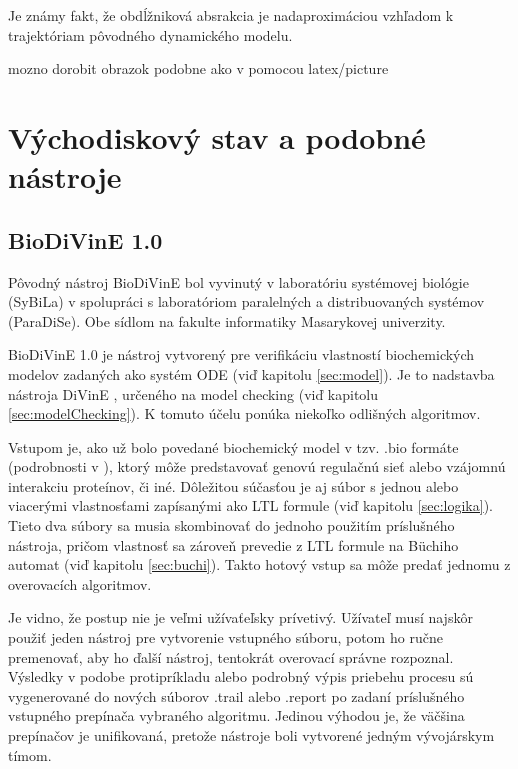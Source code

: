 \documentclass[11pt,final,oneside]{fithesis}
\begin{document}
Je zn\'amy fakt, \v ze obd\'l\v znikov\'a absrakcia je nadaproxim\'aciou vzh\v ladom k trajekt\'oriam p\^ ovodn\'eho dynamick\'eho modelu.
\cite{BIODIVINE}

mozno dorobit obrazok podobne ako v \cite{BIODIVINE} pomocou latex/picture


\chapter{V\'ychodiskov\'y stav a podobn\' e n\'astroje}

\section{BioDiVinE 1.0}
\label{sec:biodivine}
P\^ ovodn\'y n\'astroj BioDiVinE bol vyvinut\'y v laborat\'oriu syst\'emovej biol\'ogie (SyBiLa)\cite{sybila} v spolupr\'aci s laborat\'oriom paraleln\'ych 
a distribuovan\'ych syst\'emov (ParaDiSe)\cite{paradise}. Obe s\'idlom na fakulte informatiky Masarykovej univerzity. 

BioDiVinE 1.0 je n\'astroj vytvoren\'y pre verifik\'aciu vlastnost\'i biochemick\'ych modelov zadan\'ych ako syst\'em ODE (vi\v d kapitolu \ref{sec:model}).
Je to nadstavba n\'astroja DiVinE \cite{divine}, ur\v cen\'eho na model checking (vi\v d kapitolu \ref{sec:modelChecking}). K tomuto 
\'u\v celu pon\'uka nieko\v lko odli\v sn\'ych algoritmov.

Vstupom je, ako u\v z bolo povedan\'e biochemick\'y model v tzv. .bio form\'ate (podrobnosti v \cite{sybila-biodivine}), ktor\'y 
m\^ o\v ze predstavova\v t genov\'u regula\v cn\'u sie\v t alebo vz\'ajomn\'u interakciu prote\'inov, \v ci in\'e. D\^ ole\v zitou s\'u\v cas\v tou je aj
s\'ubor s jednou alebo viacer\'ymi vlastnos\v tami zap\'isan\'ymi ako LTL formule (vi\v d kapitolu \ref{sec:logika}). Tieto dva s\'ubory sa musia skombinova\v t
do jednoho pou\v zit\'im pr\'islu\v sn\'eho n\'astroja, pri\v com vlastnos\v t sa z\'arove\v n prevedie z LTL formule na B\" uchiho automat (vi\v d kapitolu 
\ref{sec:buchi}). Takto hotov\'y vstup sa m\^ o\v ze preda\v t jednomu z overovac\'ich algoritmov.

Je vidno, \v ze postup nie je ve\v lmi u\v z\'iva\v te\v lsky pr\'ivetiv\'y. U\v z\'ivate\v l mus\'i najsk\^ or pou\v zi\v t jeden n\'astroj 
pre vytvorenie vstupn\'eho s\'uboru, potom ho ru\v cne premenova\v t, aby ho \v dal\v s\'i n\'astroj, tentokr\'at overovac\'i spr\'avne rozpoznal. V\'ysledky
v podobe protipr\'ikladu alebo podrobn\'y v\'ypis priebehu procesu s\'u vygenerovan\'e do nov\'ych s\'uborov .trail alebo .report po zadan\'i pr\'islu\v sn\'eho
vstupn\'eho prep\'ina\v ca vybran\'eho algoritmu. Jedinou v\'yhodou je, \v ze v\"a\v c\v sina prep\'ina\v cov je unifikovan\'a, preto\v ze n\'astroje boli vytvoren\'e
jedn\'ym v\'yvoj\'arskym t\'imom.
\end{document}
